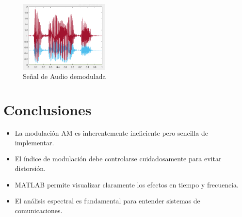 \documentclass[conference]{IEEEtran}
\begin{document}
	\begin{figure}[h]
		\centering
		\includegraphics[width=0.4\textwidth]{media/senial-demodulada}
		\caption{Señal de Audio demodulada}
		\label{fig:senial-demodulada}
	\end{figure}
		
	\section{Conclusiones}
	
	\begin{itemize}
		\item La modulación AM es inherentemente ineficiente pero sencilla de implementar.
		\item El índice de modulación debe controlarse cuidadosamente para evitar distorsión.
		\item MATLAB permite visualizar claramente los efectos en tiempo y frecuencia.
		\item El análisis espectral es fundamental para entender sistemas de comunicaciones.
	\end{itemize}
	
	
	
\end{document}
